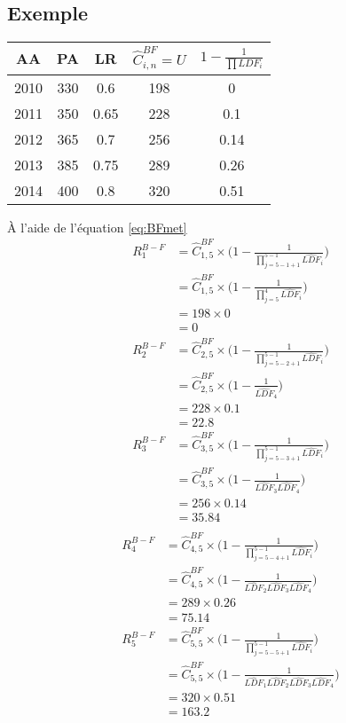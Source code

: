 \documentclass[11pt,french]{report}
\begin{document}
\subsection*{Exemple}

\begin{center}

\begin{tabular}{|c|c|c|c|c|}
  \hline
   AA & PA & LR & $\widehat{C}_{i,n}^{BF} = U$ & $1 - \frac{1}{\prod LDF_i}$  \\
  \hline
  2010 & 330 & 0.6 & 198 & 0 \\
  2011 & 350 & 0.65 & 228 & 0.1 \\
  2012 & 365 & 0.7 & 256 & 0.14 \\
  2013 & 385 & 0.75 & 289 & 0.26 \\
  2014 & 400 & 0.8 & 320 & 0.51 \\
  \hline
\end{tabular}
\end{center}
À l'aide de l'équation \ref{eq:BFmet}
\begin{align*}
R_1^{B-F} &= \widehat{C}_{1,5}^{BF} \times \Bigg( 1 - \frac{1}{\prod_{j = 5 - 1 + 1}^{5 - 1} \widehat{LDF}_i}\Bigg)  \\
&= \widehat{C}_{1,5}^{BF} \times \Bigg( 1 - \frac{1}{\prod_{j = 5 }^{4} \widehat{LDF}_i}\Bigg)  \\
&= 198 \times 0 \\
&= 0 \\
R_2^{B-F} &= \widehat{C}_{2,5}^{BF} \times \Bigg( 1 - \frac{1}{\prod_{j = 5 - 2 + 1}^{5 - 1} \widehat{LDF}_i}\Bigg)  \\
&= \widehat{C}_{2,5}^{BF} \times \Bigg( 1 - \frac{1}{\widehat{LDF}_4}\Bigg)  \\
&= 228 \times 0.1 \\
&= 22.8 \\
R_3^{B-F} &= \widehat{C}_{3,5}^{BF} \times \Bigg( 1 - \frac{1}{\prod_{j = 5 - 3 + 1}^{5 - 1} \widehat{LDF}_i}\Bigg)  \\
&= \widehat{C}_{3,5}^{BF} \times \Bigg( 1 - \frac{1}{\widehat{LDF}_3\widehat{LDF}_4}\Bigg)  \\
&= 256 \times 0.14 \\
&= 35.84 \\
\end{align*}
\begin{align*}
R_4^{B-F} &= \widehat{C}_{4,5}^{BF} \times \Bigg( 1 - \frac{1}{\prod_{j = 5 - 4 + 1}^{5 - 1} \widehat{LDF}_i}\Bigg)  \\
&= \widehat{C}_{4,5}^{BF} \times \Bigg( 1 - \frac{1}{\widehat{LDF}_2\widehat{LDF}_3\widehat{LDF}_4}\Bigg)  \\
&= 289 \times 0.26 \\
&= 75.14 \\
R_5^{B-F} &= \widehat{C}_{5,5}^{BF} \times \Bigg( 1 - \frac{1}{\prod_{j = 5 - 5 + 1}^{5 - 1} \widehat{LDF}_i}\Bigg)  \\
&= \widehat{C}_{5,5}^{BF} \times \Bigg( 1 - \frac{1}{\widehat{LDF}_1\widehat{LDF}_2\widehat{LDF}_3\widehat{LDF}_4}\Bigg)  \\
&= 320 \times 0.51 \\
&= 163.2 \\
\end{align*}
\end{document}
